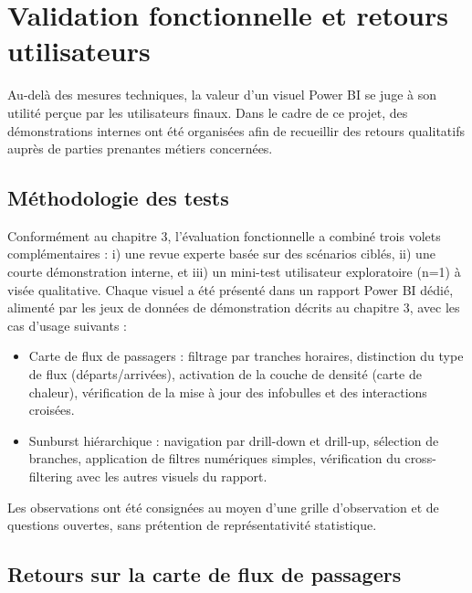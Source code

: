 \section{Validation fonctionnelle et retours utilisateurs}
\label{sec:validation-fonctionnelle}

Au-delà des mesures techniques, la valeur d’un visuel Power BI se juge à son utilité perçue par les utilisateurs finaux. Dans le cadre de ce projet, des démonstrations internes ont été organisées afin de recueillir des retours qualitatifs auprès de parties prenantes métiers concernées. 

\subsection{Méthodologie des tests}

Conformément au chapitre 3, l’évaluation fonctionnelle a combiné trois volets complémentaires : i) une revue experte basée sur des scénarios ciblés, ii) une courte démonstration interne, et iii) un mini-test utilisateur exploratoire (n=1) à visée qualitative. Chaque visuel a été présenté dans un rapport Power BI dédié, alimenté par les jeux de données de démonstration décrits au chapitre 3, avec les cas d’usage suivants :
\begin{itemize}[nosep]
  \item Carte de flux de passagers : filtrage par tranches horaires, distinction du type de flux (départs/arrivées), activation de la couche de densité (carte de chaleur), vérification de la mise à jour des infobulles et des interactions croisées.
  \item Sunburst hiérarchique : navigation par drill-down et drill-up, sélection de branches, application de filtres numériques simples, vérification du cross-filtering avec les autres visuels du rapport.
\end{itemize}
Les observations ont été consignées au moyen d’une grille d’observation et de questions ouvertes, sans prétention de représentativité statistique.

\subsection{Retours sur la carte de flux de passagers}

